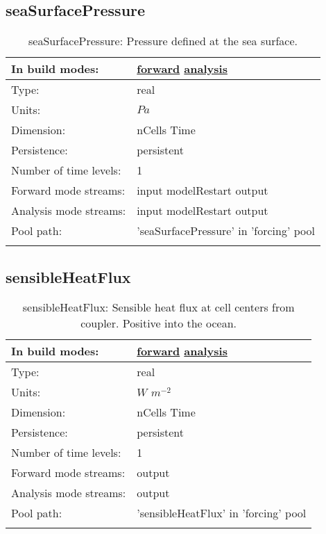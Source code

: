 \subsection[seaSurfacePressure]{seaSurfacePressure}
\label{subsec:var_sec_forcing_seaSurfacePressure}
\begin{center}
\begin{longtable}{| p{2.0in} | p{4.0in} |}
        \hline 
        In build modes: & \hyperref[subsec:forward_var_tab_forcing]{forward} \hyperref[subsec:analysis_var_tab_forcing]{analysis} \\
        \hline 
        Type: & real \\
        \hline 
        Units: & $Pa$ \\
        \hline 
        Dimension: & nCells Time \\
        \hline 
        Persistence: & persistent \\
        \hline 
        Number of time levels: & 1 \\
        \hline 
		 Forward mode streams: &  input modelRestart output \\
        \hline 
		 Analysis mode streams: &  input modelRestart output \\
        \hline 
            Pool path: & 'seaSurfacePressure' in 'forcing' pool
 \\
		 \hline 
    \caption{seaSurfacePressure: Pressure defined at the sea surface.}
\end{longtable}
\end{center}
\subsection[sensibleHeatFlux]{sensibleHeatFlux}
\label{subsec:var_sec_forcing_sensibleHeatFlux}
\begin{center}
\begin{longtable}{| p{2.0in} | p{4.0in} |}
        \hline 
        In build modes: & \hyperref[subsec:forward_var_tab_forcing]{forward} \hyperref[subsec:analysis_var_tab_forcing]{analysis} \\
        \hline 
        Type: & real \\
        \hline 
        Units: & $W$ $m^{-2}$ \\
        \hline 
        Dimension: & nCells Time \\
        \hline 
        Persistence: & persistent \\
        \hline 
        Number of time levels: & 1 \\
        \hline 
		 Forward mode streams: &  output \\
        \hline 
		 Analysis mode streams: &  output \\
        \hline 
            Pool path: & 'sensibleHeatFlux' in 'forcing' pool
 \\
		 \hline 
    \caption{sensibleHeatFlux: Sensible heat flux at cell centers from coupler. Positive into the ocean.}
\end{longtable}
\end{center}
